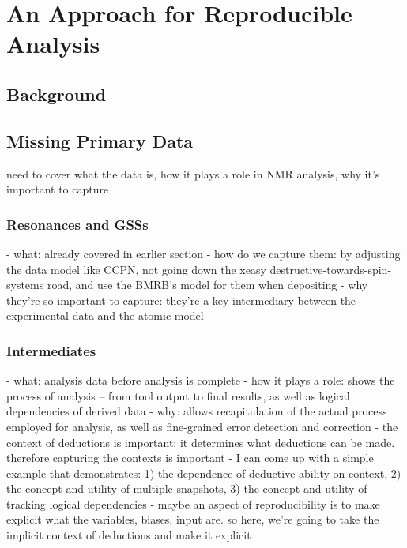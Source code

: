\chapter{An Approach for Reproducible Analysis}

\section{Background}


\section{Missing Primary Data}
need to cover what the data is, how it plays a role in NMR analysis, 
why it's important to capture

\subsection{Resonances and GSSs}
 - what: already covered in earlier section
 - how do we capture them: by adjusting the data model like CCPN, not going
   down the xeasy destructive-towards-spin-systems road, and use the BMRB's
   model for them when depositing
 - why they're so important to capture: they're a key intermediary between
   the experimental data and the atomic model

\subsection{Intermediates}
 - what: analysis data before analysis is complete
 - how it plays a role: shows the process of analysis -- from tool output to
   final results, as well as logical dependencies of derived data
 - why: allows recapitulation of the actual process employed for analysis,
   as well as fine-grained error detection and correction
 - the context of deductions is important: it determines what deductions
   can be made.  therefore capturing the contexts is important
 - I can come up with a simple example that demonstrates: 1) the dependence of
   deductive ability on context, 2) the concept and utility of multiple 
   snapshots, 3) the concept and utility of tracking logical dependencies
 - maybe an aspect of reproducibility is to make explicit what the variables,
   biases, input are.  so here, we're going to take the implicit context of
   deductions and make it explicit

